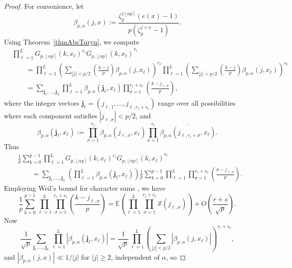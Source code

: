 \documentclass[reqno]{amsart}
\numberwithin{equation}{section}
\numberwithin{table}{section}
\numberwithin{figure}{section}
\newcommand{\leg}[2]{\left(\frac{#1}{#2}\right)}
\newcommand{\abs}[1]{\left\lvert#1\right\rvert}
\newcommand{\round}[1]{\left\lfloor#1\right\rceil}
\begin{document}
\begin{proof}
For convenience, let
\[
\beta_{p,\alpha}(j, x) := \frac{\zeta_p^{j\round{\alpha p}}(e(x)-1)}{p(\zeta_p^{j+x}-1)}.
\]
Using Theorem~\ref{thmAbsTuryn}, we compute
\begin{align*}
&\prod_{\ell=1}^L G_{p,\round{\alpha p}}(k, x_\ell)^{r_\ell} \overline{G_{p,\round{\alpha p}}(k, x_\ell)}^{s_\ell}\\
&\qquad =
\prod_{\ell=1}^L \left(\sum_{\abs{j}<p/2}\leg{k-j}{p} \beta_{p,\alpha}(j, x_\ell) \right)^{r_\ell}
\prod_{\ell=1}^L \left(\sum_{\abs{j}<p/2}\leg{k-j}{p} \overline{\beta_{p,\alpha}(j, x_\ell)} \right)^{s_\ell}\\
&\qquad =
\sum_{\mathbf{j}_1,\ldots,\mathbf{j}_L} \prod_{\ell=1}^L \beta_{p,\alpha}(\mathbf{j}_\ell, x_\ell) \prod_{\sigma=1}^{r_\ell+s_\ell} \leg{k-j_{\ell,\sigma}}{p},
\end{align*}
where the integer vectors $\mathbf{j}_\ell = (j_{\ell,1} , \ldots, j_{\ell,r_\ell+s_\ell})$ range over all possibilities where each component satisfies $\abs{j_{\ell,\sigma}}<p/2$, and
\[
\beta_{p,\alpha}(\mathbf{j}_\ell, x_\ell) := \prod_{\sigma=1}^{r_\ell} \beta_{p,\alpha}(j_{\ell,\sigma}, x_\ell) \prod_{\sigma=1}^{s_\ell} \overline{\beta_{p,\alpha}(j_{\ell,r_\ell+\sigma}, x_\ell)}.
\]
Thus
\begin{equation*}
\begin{split}
&\frac{1}{p}\sum_{k=0}^{p-1} \prod_{\ell=1}^L G_{p,\round{\alpha p}}(k, x_\ell)^{r_\ell} \overline{G_{p,\round{\alpha p}}(k, x_\ell)}^{s_\ell}\\
&\qquad =
\sum_{\mathbf{j}_1,\ldots,\mathbf{j}_L} \left(\prod_{\ell=1}^L \beta_{p,\alpha}(\mathbf{j}_\ell, x_\ell)\right) \frac{1}{p} \sum_{k=0}^{p-1} \prod_{\ell=1}^L \prod_{\sigma=1}^{r_\ell+s_\ell} \leg{k-j_{\ell,\sigma}}{p}.
\end{split}
\end{equation*}
Employing Weil's bound for character sums \cite[Theorem 2C]{Schmidt76}, we have
\[
\frac{1}{p} \sum_{k=0}^{p-1} \prod_{\ell=1}^L \prod_{\sigma=1}^{r_\ell+s_\ell} \leg{k-j_{\ell,\sigma}}{p}
=
\mathbb{E}\left(\prod_{\ell=1}^L \prod_{\sigma=1}^{r_j+s_j} \mathbb{X}(j_{\ell,\sigma}) \right) + O\left(\frac{r+s}{\sqrt{p}}\right).
\]
Now
\[
\frac{1}{\sqrt{p}} \sum_{\mathbf{j}_1,\ldots,\mathbf{j}_L} \prod_{\ell=1}^L \abs{\beta_{p,\alpha}(\mathbf{j}_\ell, x_\ell)}
=
\frac{1}{\sqrt{p}} \prod_{\ell=1}^L \left(\sum_{\abs{j}<p/2} \abs{\beta_{p,\alpha}(j,x_\ell)} \right)^{r_\ell+s_\ell},
\]
and $\abs{\beta_{p,\alpha}(j,x)}\ll1/\abs{j}$ for $\abs{j}\geq2$, independent of $\alpha$, so

\end{proof}
\end{document}
